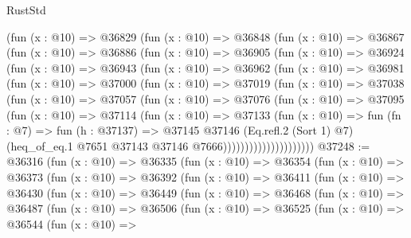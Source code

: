\begin{lexlean}{RustStd}
\begin{coremodule}
        (fun (x : @10) =>
        @36829
          (fun (x : @10) =>
          @36848
            (fun (x : @10) =>
            @36867
              (fun (x : @10) =>
              @36886
                (fun (x : @10) =>
                @36905
                  (fun (x : @10) =>
                  @36924
                    (fun (x : @10) =>
                    @36943
                      (fun (x : @10) =>
                      @36962
                        (fun (x : @10) =>
                        @36981
                          (fun (x : @10) =>
                          @37000
                            (fun (x : @10) =>
                            @37019
                              (fun (x : @10) =>
                              @37038
                                (fun (x : @10) =>
                                @37057
                                  (fun (x : @10) =>
                                  @37076
                                    (fun (x : @10) =>
                                    @37095
                                      (fun (x : @10) =>
                                      @37114
                                        (fun (x : @10) =>
                                        @37133
                                          (fun (x : @10) =>
                                          fun (fn : @7) =>
                                          fun (h : @37137) =>
                                          @37145
                                            @37146
                                            (Eq.refl.{2} (Sort 1) @7)
                                            (heq_of_eq.{1}
                                              @7651
                                              @37143
                                              @37146
                                              @7666)))))))))))))))))))))
@37248 := @36316
    (fun (x : @10) =>
    @36335
      (fun (x : @10) =>
      @36354
        (fun (x : @10) =>
        @36373
          (fun (x : @10) =>
          @36392
            (fun (x : @10) =>
            @36411
              (fun (x : @10) =>
              @36430
                (fun (x : @10) =>
                @36449
                  (fun (x : @10) =>
                  @36468
                    (fun (x : @10) =>
                    @36487
                      (fun (x : @10) =>
                      @36506
                        (fun (x : @10) =>
                        @36525
                          (fun (x : @10) =>
                          @36544
                            (fun (x : @10) =>

\end{coremodule}
\end{lexlean}
